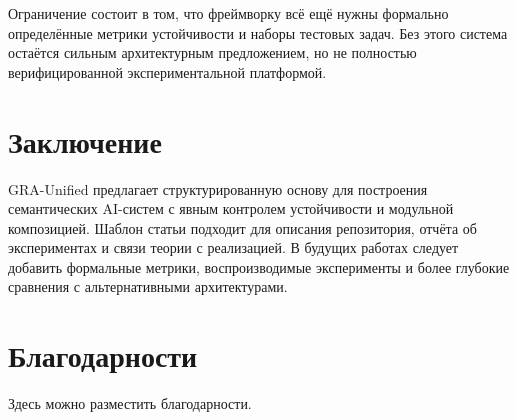 \documentclass[11pt,a4paper]{article}
\begin{document}
Ограничение состоит в том, что фреймворку всё ещё нужны формально определённые метрики устойчивости и наборы тестовых задач. Без этого система остаётся сильным архитектурным предложением, но не полностью верифицированной экспериментальной платформой.

\section{Заключение}
GRA-Unified предлагает структурированную основу для построения семантических AI-систем с явным контролем устойчивости и модульной композицией. Шаблон статьи подходит для описания репозитория, отчёта об экспериментах и связи теории с реализацией. В будущих работах следует добавить формальные метрики, воспроизводимые эксперименты и более глубокие сравнения с альтернативными архитектурами.

\section*{Благодарности}
Здесь можно разместить благодарности.


\end{document}
